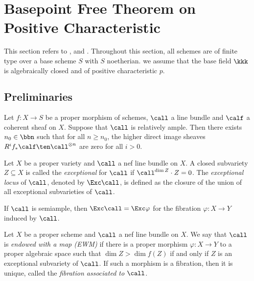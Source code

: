 \section{Basepoint Free Theorem on Positive Characteristic}

    This section refers to \cite{Kee99}, \cite{Art70} and \cite{FGA05}.
    Throughout this section, all schemes are of finite type over a base scheme \(S\) with \(S\) noetherian.
    we assume that the base field \(\kkk\) is algebraically closed and of positive characteristic $p$.

\subsection{Preliminaries}

    \begin{theorem}\label{thm:Serre_vanishing_relative_setting}
        Let \(f:X \to S\) be a proper morphism of schemes, \(\call\) a line bundle and \(\calf\) a coherent sheaf on \(X\).
        Suppose that \(\call\) is relatively ample.
        Then there exists \(n_0 \in \bbn\) such that for all \(n \geq n_0\), the higher direct image sheaves \(R^if_* \calf \ten \call^{\otimes n}\) are zero for all \(i > 0\).
    \end{theorem}

    \begin{definition}\label{def:exceptional_locus_of_nef_line_bundle}
        Let \(X\) be a proper variety and \(\call\) a nef line bundle on \(X\).
        A closed subvariety \(Z \subseteq X\) is called the \emph{exceptional} for \(\call\) if \(\call^{\dim Z} \cdot Z = 0\).
        The \emph{exceptional locus} of \(\call\), denoted by \(\Exc \call\), is defined as the closure of the union of all exceptional subvarieties of \(\call\).
    \end{definition}

    If \(\call\) is semiample, then \(\Exc \call = \Exc \varphi\) for the fibration \(\varphi: X \to Y\) induced by \(\call\).

    \begin{definition}\label{def:EWM_bpf_semiample}
        Let \(X\) be a proper scheme and \(\call\) a nef line bundle on \(X\).
        We say that \(\call\) is \emph{endowed with a map (EWM)} if there is a proper morphism \(\varphi: X \to Y\) to a proper algebraic space such that \(\dim Z > \dim f(Z)\) if and only if \(Z\) is an exceptional subvariety of \(\call\).
        If such a morphism is a fibration, then it is unique, called the \emph{fibration associated to \(\call\)}.
    \end{definition}

